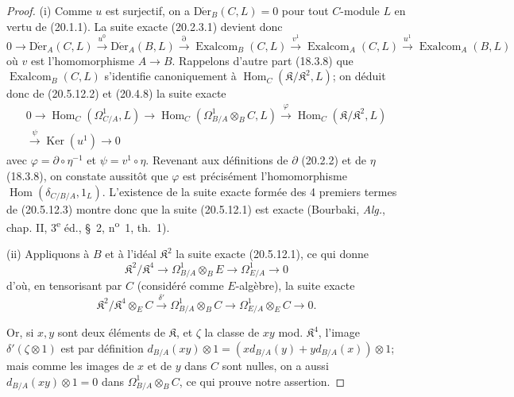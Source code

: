 \begin{proof}
(i) Comme $u$ est surjectif, on a $\operatorname{D\acute{e}r}_B(C,L)=0$ pour tout $C$-module
$L$ en vertu de (20.1.1). La suite exacte (20.2.3.1) devient donc
\begin{equation}
\tag{20.5.12.2}
\label{0.20.5.12.2-fr}
  0\longrightarrow\operatorname{D\acute{e}r}_A(C,L)\xrightarrow{u^0}\operatorname{D\acute{e}r}_A(B,L)
  \xrightarrow{\partial}\operatorname{Exalcom}_B(C,L)
  \xrightarrow{v^1}\operatorname{Exalcom}_A(C,L)
  \xrightarrow{u^1}\operatorname{Exalcom}_A(B,L)
\end{equation}
où $v$ est l'homomorphisme $A\to B$. Rappelons d'autre part (18.3.8) que
$\operatorname{Exalcom}_B(C,L)$ s'identifie canoniquement à
$\operatorname{Hom}_C(\mathfrak{K}/\mathfrak{K}^2,L)$; on déduit donc de (20.5.12.2)
et (20.4.8) la suite exacte
\begin{equation}
\tag{20.5.12.3}
\label{0.20.5.12.3-fr}
\begin{split}
  0\longrightarrow\operatorname{Hom}_C(\Omega^1_{C/A},L)
  \longrightarrow\operatorname{Hom}_C(\Omega^1_{B/A}\otimes_B C,L)
  \xrightarrow{\varphi}\operatorname{Hom}_C(\mathfrak{K}/\mathfrak{K}^2,L)\\
  \xrightarrow{\psi}\operatorname{Ker}(u^1)\longrightarrow 0
\end{split}
\end{equation}
avec $\varphi=\partial\circ\eta^{-1}$ et $\psi=v^1\circ\eta$. Revenant
aux définitions de $\partial$ (20.2.2) et de $\eta$ (18.3.8), on constate
aussitôt que $\varphi$ est précisément l'homomorphisme
$\operatorname{Hom}(\delta_{C/B/A},1_L)$. L'existence de la suite exacte formée des
4 premiers termes de (20.5.12.3) montre donc que la suite (20.5.12.1)
est exacte (Bourbaki, \emph{Alg.}, chap. II, 3\textsuperscript{e} éd.,
\S~2, n\textsuperscript{o}~1, th.~1).

\medskip
(ii) Appliquons à $B$ et à l'idéal $\mathfrak{K}^2$ la suite exacte
(20.5.12.1), ce qui donne
\begin{equation}
\tag{20.5.12.4}
\label{0.20.5.12.4-fr}
  \mathfrak{K}^2/\mathfrak{K}^4\longrightarrow
  \Omega^1_{B/A}\otimes_B E\longrightarrow\Omega^1_{E/A}\longrightarrow 0
\end{equation}
d'où, en tensorisant par $C$ (considéré comme $E$-algèbre), la suite
exacte
\[
  \mathfrak{K}^2/\mathfrak{K}^4\otimes_E C\xrightarrow{\delta'}
  \Omega^1_{B/A}\otimes_B C\longrightarrow
  \Omega^1_{E/A}\otimes_E C\longrightarrow 0.
\]

Or, si $x,y$ sont deux éléments de $\mathfrak{K}$, et $\zeta$ la classe
de $xy$ mod. $\mathfrak{K}^4$, l'image
$\delta'(\zeta\otimes1)$ est par définition
$d_{B/A}(xy)\otimes1=(xd_{B/A}(y)+yd_{B/A}(x))\otimes1$; mais comme les
images de $x$ et de $y$ dans $C$ sont nulles, on a aussi
$d_{B/A}(xy)\otimes1=0$ dans $\Omega^1_{B/A}\otimes_B C$, ce qui prouve
notre assertion.


\end{proof}
